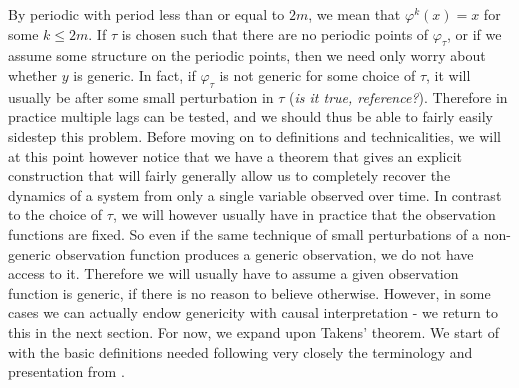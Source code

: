 \documentclass[11pt, a4paper]{memoir}
\theoremstyle{break}
\theoremstyle{break}
\theoremstyle{nonumberplain}
\begin{document}
By periodic with period less than or equal to $2m$, we mean that $\varphi^{k}(x)=x$ for some $k\leqslant 2m$. If $\tau$ is chosen such that there are no periodic points of $\varphi_\tau$, or if we assume some structure on the periodic points, then we need only worry about whether $y$ is generic. In fact, if $\varphi_\tau$ is not generic for some choice of $\tau$, it will usually be after some small perturbation in $\tau$ (\textit{is it true, reference?}). Therefore in practice multiple lags can be tested, and we should thus be able to fairly easily sidestep this problem. Before moving on to definitions and technicalities, we will at this point however notice that we have a theorem that gives an explicit construction that will fairly generally allow us to completely recover the dynamics of a system from only a single variable observed over time. In contrast to the choice of $\tau$, we will however usually have in practice that the observation functions are fixed. So even if the same technique of small perturbations of a non-generic observation function produces a generic observation, we do not have access to it. Therefore we will usually have to assume a given observation function is generic, if there is no reason to believe otherwise. However, in some cases we can actually endow genericity with causal interpretation - we return to this in the next section. For now, we expand upon Takens' theorem.  We start of with the basic definitions needed following very closely the terminology and presentation from \cite{Huke2}. 
\end{document}
